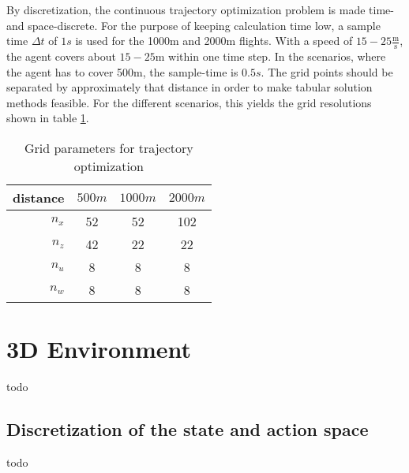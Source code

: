 By discretization, the continuous trajectory optimization problem is made time- and space-discrete. For the purpose of keeping calculation time low, a sample time $\Delta t$ of $1s$ is used for the 1000m and 2000m flights. With a speed of $15-25 \frac{\text{m}}{\text{s}}$, the agent covers about $15-25\text{m}$ within one time step. In the scenarios, where the agent has to cover 500m, the sample-time is $0.5s$. The grid points should be separated by approximately that distance in order to make tabular solution methods feasible. For the different scenarios, this yields the grid resolutions shown in table \ref{tab:grids}.
\begin{table}
	\begin{center}
		\begin{tabular}{r|c c c}
			distance & $500m$ & $1000m$ & $2000m$ \\ \hline
			$n_x$ & 52 & 52 & 102 \\
			$n_z$ & 42 & 22 & 22\\
			$n_u$ & 8 & 8 & 8 \\
			$n_w$ & 8 & 8 & 8
		\end{tabular}
	\end{center}
	\caption{Grid parameters for trajectory optimization}
	\label{tab:grids}
\end{table}

\section{3D Environment}

todo

\subsection{Discretization of the state and action space}
\label{sec:disc3d}
todo